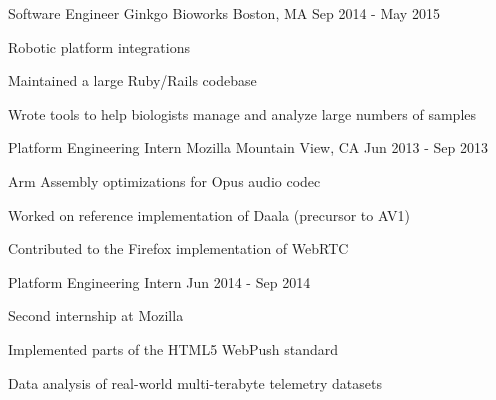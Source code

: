 \begin{cventries}
  \cventry
    {Software Engineer}
    {Ginkgo Bioworks}
    {Boston, MA}
    {Sep 2014 - May 2015}
    {
      \begin{cvitems}
        \item {Robotic platform integrations}
        \item {Maintained a large Ruby/Rails codebase}
        \item {Wrote tools to help biologists manage and analyze large numbers of samples}
      \end{cvitems}
    }

  \cventrytwopositions
    {Platform Engineering Intern}
    {Mozilla}
    {Mountain View, CA}
    {Jun 2013 - Sep 2013}
    {
      \begin{cvitems}
        \item {Arm Assembly optimizations for Opus audio codec}
        \item {Worked on reference implementation of Daala (precursor to AV1)}
        \item {Contributed to the Firefox implementation of WebRTC}
      \end{cvitems}
    }
    {Platform Engineering Intern}
    {Jun 2014 - Sep 2014}
    {
      \begin{cvitems}
        \item {Second internship at Mozilla}
        \item {Implemented parts of the HTML5 WebPush standard}
        \item {Data analysis of real-world multi-terabyte telemetry datasets}
      \end{cvitems}
    }

\end{cventries}
